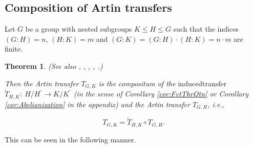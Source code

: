 \documentclass{amsart}
\newtheorem{theorem}{Theorem}[section]
\theoremstyle{definition}
\numberwithin{equation}{section}
\begin{document}
\subsection{Composition of Artin transfers}
\label{ss:Composition}

Let \(G\) be a group with nested subgroups \(K\le H\le G\) such that the indices
\((G:H)=n\), \((H:K)=m\) and \((G:K)=(G:H)\cdot (H:K)=n\cdot m\) are finite.


\begin{theorem}
\label{thm:Composition}
(See also
\cite[Thm.14.2.1, p.202]{Hl},
\cite[Satz 1.6, p.415]{Hp},
\cite[Lem.(17.3), p.61]{DkHw},
\cite[Thm.10.8, p.301]{Is},
\cite[Prop.3, p.3]{Ol}.)

Then the Artin transfer \(T_{G,K}\) is the compositum of
the \(\mathrm{induced transfer}\) \(\tilde{T}_{H,K}:\ H/H^\prime\to K/K^\prime\)
(in the sense of Corollary
\ref{cor:FctThrQtn}
or Corollary
\ref{cor:Abelianization}
in the appendix)
and the Artin transfer \(T_{G,H}\), i.e.,

\begin{equation}
\label{eqn:Composition}
T_{G,K} = \tilde{T}_{H,K}\circ T_{G,H}.
\end{equation}

\end{theorem}

\noindent
This can be seen in the following manner.
\end{document}
